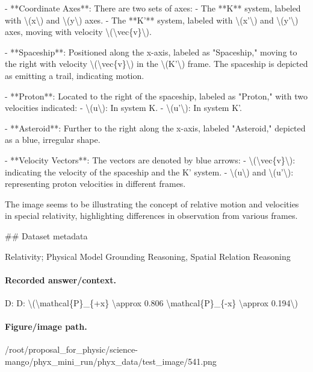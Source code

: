 - **Coordinate Axes**: There are two sets of axes:
  - The **K** system, labeled with \textbackslash{}(x\textbackslash{}) and \textbackslash{}(y\textbackslash{}) axes.
  - The **K'** system, labeled with \textbackslash{}(x'\textbackslash{}) and \textbackslash{}(y'\textbackslash{}) axes, moving with velocity \textbackslash{}(\textbackslash{}vec\{v\}\textbackslash{}).

- **Spaceship**: Positioned along the x-axis, labeled as "Spaceship," moving to the right with velocity \textbackslash{}(\textbackslash{}vec\{v\}\textbackslash{}) in the \textbackslash{}(K'\textbackslash{}) frame. The spaceship is depicted as emitting a trail, indicating motion.

- **Proton**: Located to the right of the spaceship, labeled as "Proton," with two velocities indicated:
  - \textbackslash{}(u\textbackslash{}): In system K.
  - \textbackslash{}(u'\textbackslash{}): In system K'.

- **Asteroid**: Further to the right along the x-axis, labeled "Asteroid," depicted as a blue, irregular shape.

- **Velocity Vectors**: The vectors are denoted by blue arrows:
  - \textbackslash{}(\textbackslash{}vec\{v\}\textbackslash{}): indicating the velocity of the spaceship and the K' system.
  - \textbackslash{}(u\textbackslash{}) and \textbackslash{}(u'\textbackslash{}): representing proton velocities in different frames.

The image seems to be illustrating the concept of relative motion and velocities in special relativity, highlighting differences in observation from various frames.

\#\# Dataset metadata

Relativity; Physical Model Grounding Reasoning, Spatial Relation Reasoning

\paragraph{Recorded answer/context.}
D: D: \textbackslash{}(\textbackslash{}mathcal\{P\}\_\{+x\} \textbackslash{}approx 0.806 \textbackslash{}mathcal\{P\}\_\{-x\} \textbackslash{}approx 0.194\textbackslash{})

\paragraph{Figure/image path.}
/root/proposal\_for\_physic/science-mango/phyx\_mini\_run/phyx\_data/test\_image/541.png


